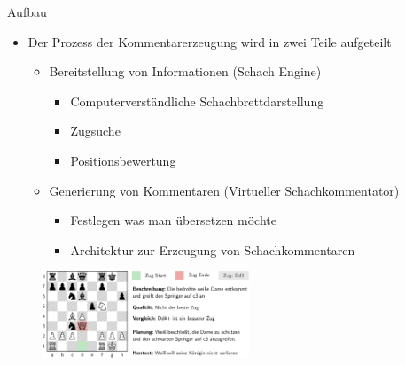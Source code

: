 \begin{frame}{Aufbau}
\begin{itemize}
	\item Der Prozess der Kommentarerzeugung wird in zwei Teile aufgeteilt
	\begin{itemize}
		\item Bereitstellung von Informationen (Schach Engine)
		\begin{itemize}
			\item Computerverständliche Schachbrettdarstellung
			\item Zugsuche
			\item Positionsbewertung
		\end{itemize}
		\item Generierung von Kommentaren (Virtueller Schachkommentator)
		\begin{itemize}
			\item Festlegen was man übersetzen möchte
			\item Architektur zur Erzeugung von Schachkommentaren
		\end{itemize}
	\end{itemize}
\end{itemize}
\begin{figure}
\centering
\includegraphics[width=0.55\textwidth]{graphics/commentator_example/commentator.png}
\end{figure}
\end{frame}
